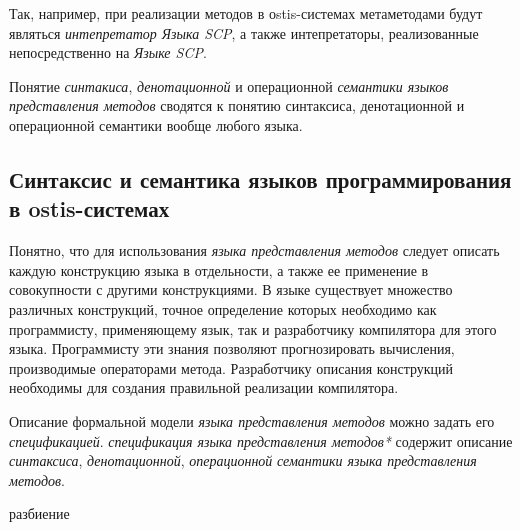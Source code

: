 Так, например, при реализации методов в оstis-системах метаметодами будут являться \textit{интепретатор Языка SCP}, а также интепретаторы, реализованные непосредственно на \textit{Языке SCP}.

Понятие \textit{синтакиса}, \textit{денотационной} и операционной \textit{семантики языков представления методов} сводятся к понятию синтаксиса, денотационной и операционной семантики вообще любого языка.

\subsection{Синтаксис и семантика языков программирования в ostis-системах}
\label{sec_programs_method_representation_language_syntax_and_semantic}

Понятно, что для использования \textit{языка представления методов} следует описать каждую конструкцию языка в отдельности, а также ее применение в совокупности с другими конструкциями. В языке существует множество различных конструкций, точное определение которых необходимо как программисту, применяющему язык, так и разработчику компилятора для этого языка. Программисту эти знания позволяют прогнозировать вычисления, производимые операторами метода. Разработчику описания конструкций необходимы для создания правильной реализации компилятора.

Описание формальной модели \textit{языка представления методов} можно задать его \textit{спецификацией}. \textit{спецификация языка представления методов*} содержит описание \textit{синтаксиса}, \textit{денотационной}, \textit{операционной} \textit{семантики языка представления методов}.

\begin{SCn}
\begin{scnrelfromset}{разбиение}
    \begin{scnindent}
    \end{scnindent}
    \begin{scnindent}
    \end{scnindent}
    \begin{scnindent}
    \end{scnindent}
\end{scnrelfromset}
\end{SCn}

